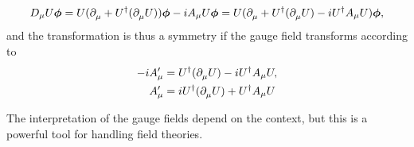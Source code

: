 \begin{align*}
	D_{\mu}U\vb*{\phi} = U(\partial^{}_{\mu}{} + U^{\dagger}(\partial^{}_{\mu}{U}))\vb*{\phi} - iA_{\mu}U\vb*{\phi} = U(\partial^{}_{\mu}{} + U^{\dagger}(\partial^{}_{\mu}{U}) - iU^{\dagger}A_{\mu}U)\vb*{\phi},
\end{align*}
and the transformation is thus a symmetry if the gauge field transforms according to
\begin{align*}
	-iA^{\prime}_{\mu} &= U^{\dagger}(\partial^{}_{\mu}{U}) - iU^{\dagger}A_{\mu}U, \\
	A^{\prime}_{\mu}   &= iU^{\dagger}(\partial^{}_{\mu}{U})  + U^{\dagger}A_{\mu}U
\end{align*}

The interpretation of the gauge fields depend on the context, but this is a powerful tool for handling field theories.